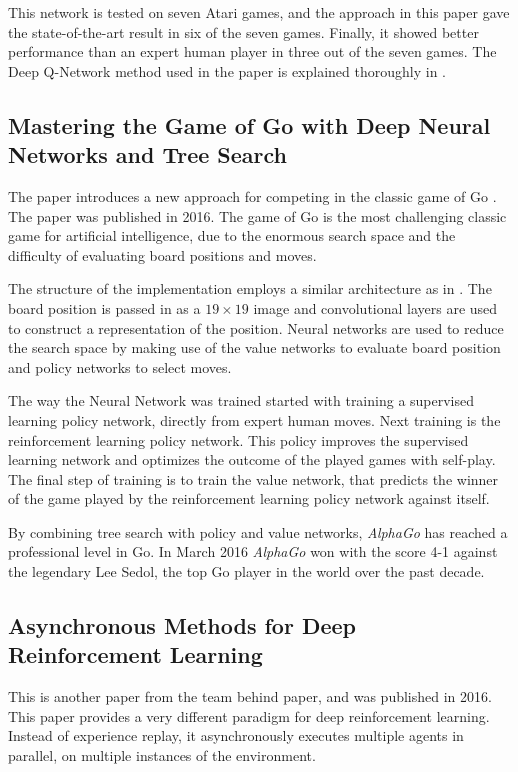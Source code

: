 This network is tested on seven Atari games, and the approach in this paper gave the state-of-the-art result in six of the seven games. Finally, it showed better performance than an expert human player in three out of the seven games. The Deep Q-Network method used in the paper is explained thoroughly in .

\subsection{Mastering the Game of Go with Deep Neural Networks and Tree Search}
The paper \cite{Silver_2016} introduces a new approach for competing in the classic game of Go \cite{explain_go}. The paper was published in 2016. The game of Go is the most challenging classic game for artificial intelligence, due to the enormous search space and the difficulty of evaluating board positions and moves.

The structure of the implementation employs a similar architecture as in \cite{DBLP:journals/corr/MnihKSGAWR13}. The board position is passed in as a $19 \times 19$ image and convolutional layers are used to construct a representation of the position. Neural networks are used to reduce the search space by making use of the value networks to evaluate board position and policy networks to select moves.

The way the Neural Network was trained started with training a supervised learning policy network, directly from expert human moves. Next training is the reinforcement learning policy network. This policy improves the supervised learning network and optimizes the outcome of the played games with self-play. The final step of training is to train the value network, that predicts the winner of the game played by the reinforcement learning policy network against itself. 

By combining tree search with policy and value networks, \textit{AlphaGo} has reached a professional level in Go. In March 2016 \textit{AlphaGo} won with the score 4-1 against the legendary Lee Sedol, the top Go player in the world over the past decade.

\subsection{Asynchronous Methods for Deep Reinforcement Learning}\label{AsyncMeths}
This is another paper \cite{DBLP:journals/corr/MnihBMGLHSK16} from the team behind \cite{DBLP:journals/corr/MnihKSGAWR13} paper, and was published in 2016. This paper provides a very different paradigm for deep reinforcement learning. Instead of experience replay, it asynchronously executes multiple agents in parallel, on multiple instances of the environment. 

